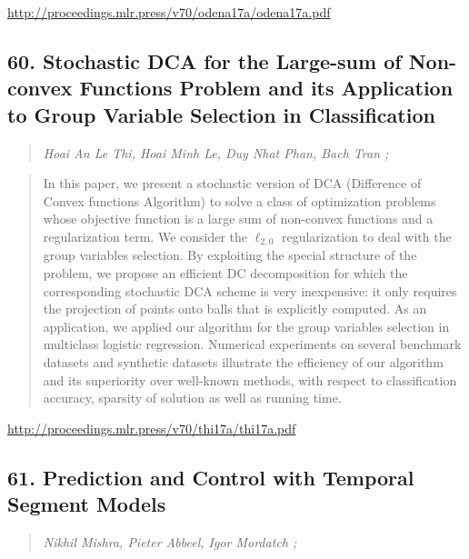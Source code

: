 \documentclass{article}
\begin{document}
\href{http://proceedings.mlr.press/v70/odena17a/odena17a.pdf}{http://proceedings.mlr.press/v70/odena17a/odena17a.pdf}

\subsection{60. Stochastic DCA for the Large-sum of Non-convex Functions Problem and its Application to Group Variable Selection in Classification}

\begin{quote}
\footnotesize{\textit{Hoai An Le Thi, Hoai Minh Le, Duy Nhat Phan, Bach Tran ;}}
\end{quote}

\begin{quote}
    In this paper, we present a stochastic version of DCA (Difference of Convex functions Algorithm) to solve a class of optimization problems whose objective function is a large sum of non-convex functions and a regularization term. We consider the $\ell_{2,0}$ regularization to deal with the group variables selection. By exploiting the special structure of the problem, we propose an efficient DC decomposition for which the corresponding stochastic DCA scheme is very inexpensive: it only requires the projection of points onto balls that is explicitly computed. As an application, we applied our algorithm for the group variables selection in multiclass logistic regression. Numerical experiments on several benchmark datasets and synthetic datasets illustrate the efficiency of our algorithm and its superiority over well-known methods, with respect to classification accuracy, sparsity of solution as well as running time.  \end{quote}

\href{http://proceedings.mlr.press/v70/thi17a/thi17a.pdf}{http://proceedings.mlr.press/v70/thi17a/thi17a.pdf}

\subsection{61. Prediction and Control with Temporal Segment Models}

\begin{quote}
\footnotesize{\textit{Nikhil Mishra, Pieter Abbeel, Igor Mordatch ;}}
\end{quote}
\end{document}
